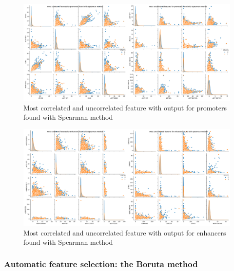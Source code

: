 \begin{figure}[h!]
\centering
\includegraphics[width=0.98\linewidth]{../images/plot_spearman_promoters_correlated_uncorrelated.png}
\caption{Most correlated and uncorrelated feature with output for promoters found with Spearman method}
\end{figure}
\newpage
\begin{figure}[h!]
\centering
\includegraphics[width=0.98\linewidth]{../images/plot_spearman_enhancers_correlated_uncorrelated.png}
\caption{Most correlated and uncorrelated feature with output for enhancers found with Spearman method}
\end{figure}

\subsubsection{Automatic feature selection: the Boruta
method}

